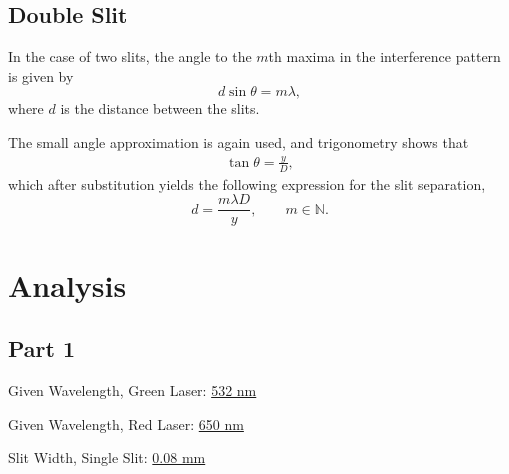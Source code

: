 \documentclass[twocolumn,english]{IEEEtran}
\theoremstyle{plain}
\theoremstyle{plain}
\begin{document}
\subsection{Double Slit}
In the case of two slits, the angle to the $m$th maxima in the interference pattern is given by
\begin{equation}\label{eq:double_slit}
	d\sin\theta = m\lambda,
\end{equation}
where $d$ is the distance between the slits.

The small angle approximation is again used, and trigonometry shows that
\begin{align*}
	\tan\theta = \frac{y}{D},
\end{align*}
which after substitution yields the following expression for the slit separation,
\begin{equation}\label{eq:dbl_slit_distance}
	d = \frac{m\lambda D}{y}, \qquad m\in\mathbb{N}.
\end{equation}

\hrulefill





\section{Analysis}
\subsection{Part 1}
Given Wavelength, Green Laser: \hfill\underline{532 nm}

Given Wavelength, Red Laser: \hfill\underline{ 650 nm}

Slit Width, Single Slit: \hfill\underline{0.08 mm}
\end{document}
